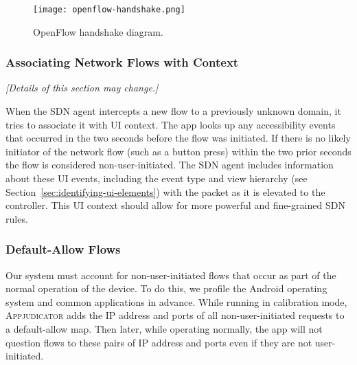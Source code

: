 \begin{wrapfigure}{R}{0.4\textwidth}
	\centering
	\texttt{[image: openflow-handshake.png]}
    \caption{OpenFlow handshake diagram.}
    \label{fig:openflow-handshake}
\end{wrapfigure}


\subsubsection{Associating Network Flows with Context}
\label{sec:associating-network-flows-with-context}

\textit{[Details of this section may change.]}

When the SDN agent intercepts a new flow to a previously unknown domain, it
tries to associate it with UI context. The app looks up any accessibility events
that occurred in the two seconds before the flow was initiated. If there is no
likely initiator of the network flow (such as a button press) within the two
prior seconds the flow is considered non-user-initiated. The SDN agent includes
information about these UI events, including the event type and view hierarchy
(see Section~\ref{sec:identifying-ui-elements}) with the packet as it is
elevated to the controller. This UI context should allow for more powerful and
fine-grained SDN rules.


\subsubsection{Default-Allow Flows}
\label{sec:default-allow-flows}

Our system must account for non-user-initiated flows that occur as part of the
normal operation of the device. To do this, we profile the Android operating
system and common applications in advance.  While running in calibration mode,
\textsc{Appjudicator} adds the IP address and ports of all non-user-initiated
requests to a default-allow map. Then later, while operating normally, the app
will not question flows to these pairs of IP address and ports even if they are
not user-initiated.



\newpage

